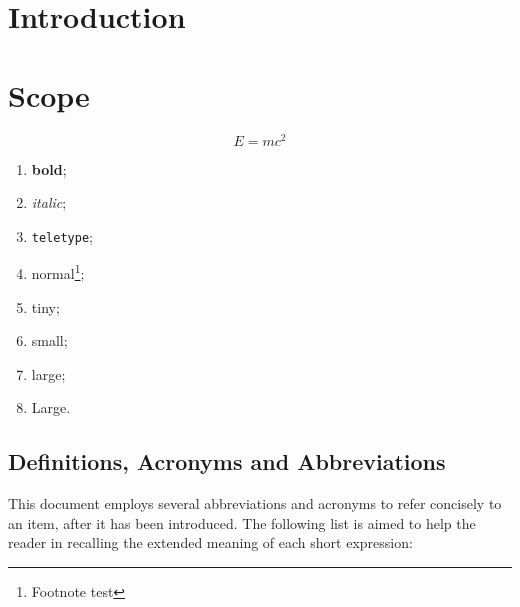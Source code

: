 \section{Introduction}
\label{sec:intro}

\lipsum

\section{Scope}
\label{sec:scope}

\begin{equation}
  \label{eq:eq}
  E = mc^2
\end{equation}

\begin{enumerate}
\item {\bf bold};
\item {\it italic};
\item {\tt teletype};
\item normal\footnote{Footnote test};
\item {\tiny tiny};
\item {\small small};
\item {\large large};
\item {\Large Large}.
\end{enumerate}

\subsection{Definitions, Acronyms and Abbreviations}
\label{sec:acronyms}

This document employs several abbreviations and acronyms to refer concisely to an item, after it has been introduced. The following list is aimed to help the reader in recalling the extended meaning of each short expression:

